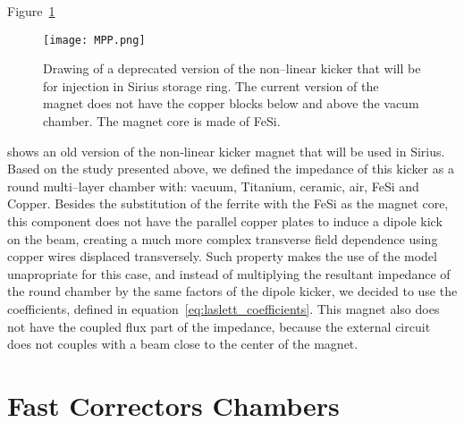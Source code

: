     Figure~\ref{fig:non_linear_kicker}
    \begin{figure}
        \centering
        \texttt{[image: MPP.png]}
        \caption[Drawing of non--linear kicker magnet.]{Drawing of a deprecated version of the non--linear kicker that will be for injection in Sirius storage ring. The current version of the magnet does not have the copper blocks below and above the vacum chamber. The magnet core is made of FeSi.}
        \label{fig:non_linear_kicker}
    \end{figure}
    shows an old version of the non-linear kicker magnet that will be used in Sirius. Based on the study presented above, we defined the impedance of this kicker as a round multi--layer chamber with: vacuum, Titanium, ceramic, air, FeSi and Copper. Besides the substitution of the ferrite with the FeSi as the magnet core, this component does not have the parallel copper plates to induce a dipole kick on the beam, creating a much more complex transverse field dependence using copper wires displaced transversely.  Such property makes the use of the \citeauthor{Tsutsui2000} model unapropriate for this case, and instead of multiplying the resultant impedance of the round chamber by the same factors of the dipole kicker, we decided to use the \citeauthor{Laslett1963} coefficients, defined in equation~\eqref{eq:laslett_coefficients}. This magnet also does not have the coupled flux part of the impedance, because the external circuit does not couples with a beam close to the center of the magnet.

\section{Fast Correctors Chambers}

